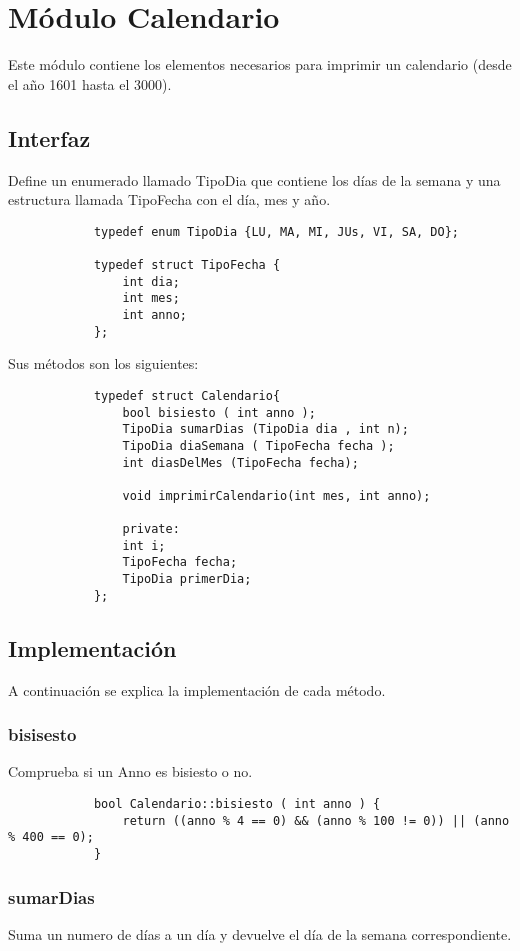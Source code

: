 \documentclass[12pt]{article}
\begin{document}
		\section{Módulo Calendario}
		Este módulo contiene los elementos necesarios para imprimir un calendario (desde el año 1601 hasta el 3000).
		
		\subsection{Interfaz}
		Define un enumerado llamado TipoDia que contiene los días de la semana y una estructura llamada TipoFecha con el día, mes y año.
		
		\begin{lstlisting}
			typedef enum TipoDia {LU, MA, MI, JUs, VI, SA, DO};
			
			typedef struct TipoFecha {
				int dia;
				int mes;
				int anno;
			};
		\end{lstlisting}	
		
		Sus métodos son los siguientes:
		
		\begin{lstlisting}
			typedef struct Calendario{
				bool bisiesto ( int anno );
				TipoDia sumarDias (TipoDia dia , int n);
				TipoDia diaSemana ( TipoFecha fecha );
				int diasDelMes (TipoFecha fecha);
				
				void imprimirCalendario(int mes, int anno);
				
				private:
				int i;
				TipoFecha fecha;
				TipoDia primerDia;
			};
		\end{lstlisting}
		
		\subsection{Implementación}
		A continuación se explica la implementación de cada método.
		
		\subsubsection{bisisesto}
		Comprueba si un Anno es bisiesto o no.
		
		\begin{lstlisting}
			bool Calendario::bisiesto ( int anno ) {
				return ((anno % 4 == 0) && (anno % 100 != 0)) || (anno % 400 == 0);
			}
		\end{lstlisting}
		
		\subsubsection{sumarDias}
		Suma un numero de días a un día y devuelve el día de la semana correspondiente.
		
\end{document}
